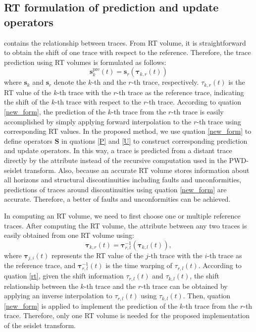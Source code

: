 \subsection{RT formulation of prediction and update operators}
     contains the relationship between traces. 
    From RT volume, it is straightforward to obtain the shift of one trace with 
    respect to the reference. 
    Therefore, the trace prediction using RT volumes is formulated as follows:
    \begin{equation}
        \mathbf{s}_k^{\text{pre}}(t)=\mathbf{s}_r(\mathbf{\tau}_{k,r}(t))
        \label{new_form}
    \end{equation}
    where $\mathbf{s}_k$ and $\mathbf{s}_r$ denote the $k$-th and the $r$-th 
    trace, respectively. 
    $\tau_{k,r}(t)$ is the RT value of the $k$-th trace with the $r$-th trace as 
    the reference trace, indicating the shift of the $k$-th trace with
    respect to the $r$-th trace. 
    According to quation \ref{new_form}, the prediction of the 
    $k$-th trace from the $r$-th trace is easily accomplished by simply applying 
    forward interpolation to the $r$-th trace using corresponding RT values.
    In the proposed method, we use quation \ref{new_form} to 
    define operators $\mathbf{S}$ in quations \ref{P} and 
    \ref{U} to construct corresponding prediction and update operators. 
    In this way, a trace is predicted from a distant trace directly by the 
     attribute instead of the recursive computation 
    used in the PWD-seislet transform. 
    Also, because an accurate RT volume stores information about all horizons 
    and structural discontinuities including faults and unconformities, 
    predictions of traces around discontinuities using quation 
    \ref{new_form} are accurate. 
    Therefore, a better  of faults and unconformities can be 
    achieved.

    In computing an RT volume, we need to first choose one or multiple reference 
    traces. 
    After computing the RT volume, the  attribute 
    between any two traces is easily obtained from one RT volume using:
    \begin{equation}
        \label{rt}
        \mathbf{\tau}_{k,r}(t)=\mathbf{\tau}^{-1}_{r,l}(\mathbf{\tau}_{k,l}(t)),
    \end{equation}
    where $\mathbf{\tau}_{j,i}(t)$ represents the RT value of the $j$-th trace 
    with the $i$-th trace as the reference trace, and 
    $\mathbf{\tau}^{-1}_{r,l}(t)$ is the time warping \cite[]{Burnett2009} of 
    $\tau_{r,l}(t)$. 
    According to quation \ref{rt}, given the shift information 
    $\tau_{r,l}(t)$ and $\tau_{k,l}(t)$, the shift relationship between the 
    $k$-th trace and the $r$-th trace can be obtained by applying an inverse 
    interpolation to $\tau_{r,l}(t)$ using $\tau_{k,l}(t)$. 
    Then, quation \ref{new_form} is applied to implement the 
    prediction of the $k$-th trace from the $r$-th trace.
    Therefore, only one RT volume is needed for the proposed implementation of 
    the seislet transform. 


